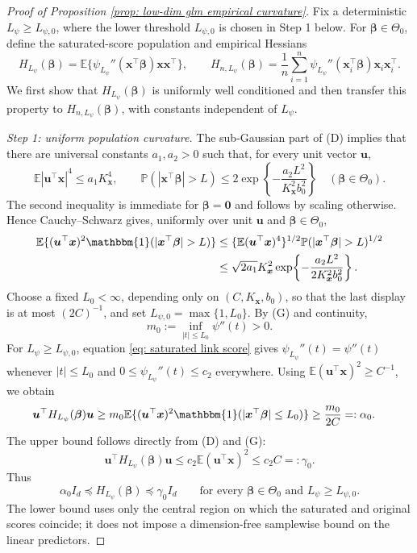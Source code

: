 \documentclass[letterpaper,12pt]{article}
\numberwithin{equation}{section}
\theoremstyle{plain}
\numberwithin{Theorem}{section}
\numberwithin{proposition}{section}
\numberwithin{Lemma}{section}
{
	\theoremstyle{definition}
	\newtheorem{Definition}{Definition}
	\newtheorem{example}{Example}
	\numberwithin{example}{section}
	\newtheorem{fact}{Fact}
	\numberwithin{fact}{section}
	\newtheorem{remark}{Remark}
}
\newcommand{\Pro}{\mathbb{P}}
\newcommand{\1}{\mathbbm{1}}
\def\bbeta{{\boldsymbol{\beta}}}
\def\E{\mathbb{E}}
\begin{document}
\begin{proof}[Proof of Proposition \ref{prop: low-dim glm empirical curvature}]
	Fix a deterministic $L_\psi\geq L_{\psi,0}$, where the lower
	threshold $L_{\psi,0}$ is chosen in Step 1 below.  For
	$\bbeta\in\Theta_0$, define the saturated-score population and empirical
	Hessians
	\[
	H_{L_\psi}(\bbeta)
	=\E\{\psi_{L_\psi}''(\bm x^\top\bbeta)\bm x\bm x^\top\},
	\qquad
	H_{n,L_\psi}(\bbeta)=\frac1n\sum_{i=1}^n
	\psi_{L_\psi}''(\bm x_i^\top\bbeta)\bm x_i\bm x_i^\top.
	\]
	We first show that $H_{L_\psi}(\bbeta)$ is uniformly well conditioned
	and then transfer this property to $H_{n,L_\psi}(\bbeta)$, with
	constants independent of $L_\psi$.

	\textit{Step 1: uniform population curvature.}
	The sub-Gaussian part of (D) implies that there are universal constants $a_1,a_2>0$ such that, for every unit vector $\bm u$,
	\[
	\E|\bm u^\top\bm x|^4\leq a_1K_{\bm x}^4,
	\qquad
	\Pro(|\bm x^\top\bbeta|>L)
	\leq2\exp\!\left\{-\frac{a_2L^2}{K_{\bm x}^2b_0^2}\right\}
	\quad(\bbeta\in\Theta_0).
	\]
	The second inequality is immediate for $\bbeta=\bm0$ and follows by scaling otherwise.  Hence Cauchy--Schwarz gives, uniformly over unit $\bm u$ and $\bbeta\in\Theta_0$,
	\begin{align*}
	\E\{(\bm u^\top\bm x)^2\1(|\bm x^\top\bbeta|>L)\}
	&\leq \{\E(\bm u^\top\bm x)^4\}^{1/2}
	\Pro(|\bm x^\top\bbeta|>L)^{1/2}\\
	&\leq \sqrt{2a_1}K_{\bm x}^2
	\exp\!\left\{-\frac{a_2L^2}{2K_{\bm x}^2b_0^2}\right\}.
	\end{align*}
	Choose a fixed $L_0<\infty$, depending only on $(C,K_{\bm x},b_0)$, so that the last display is at most $(2C)^{-1}$, and set
	$L_{\psi,0}=\max\{1,L_0\}$. By (G) and continuity,
	\[
	m_0:=\inf_{|t|\leq L_0}\psi''(t)>0.
	\]
	For $L_\psi\geq L_{\psi,0}$, equation
	\eqref{eq: saturated link score} gives
	$\psi_{L_\psi}''(t)=\psi''(t)$ whenever $|t|\leq L_0$ and
	$0\leq\psi_{L_\psi}''(t)\leq c_2$ everywhere.  Using
	$\E(\bm u^\top\bm x)^2\geq C^{-1}$, we obtain
	\begin{align*}
	\bm u^\top H_{L_\psi}(\bbeta)\bm u
	&\geq m_0\E\{(\bm u^\top\bm x)^2
	\1(|\bm x^\top\bbeta|\leq L_0)\}
	\geq \frac{m_0}{2C}=: \alpha_0.
	\end{align*}
	The upper bound follows directly from (D) and (G):
	\[
	\bm u^\top H_{L_\psi}(\bbeta)\bm u
	\leq c_2\E(\bm u^\top\bm x)^2
	\leq c_2C=:\gamma_0.
	\]
	Thus
	\begin{equation}\label{eq: low-dim glm population curvature}
	\alpha_0I_d\preceq H_{L_\psi}(\bbeta)\preceq\gamma_0I_d
	\qquad\text{for every }\bbeta\in\Theta_0
	\text{ and }L_\psi\geq L_{\psi,0}.
	\end{equation}
	The lower bound uses only the central region on which the saturated and
	original scores coincide; it does not impose a dimension-free
	samplewise bound on the linear predictors.


\end{proof}
\end{document}
